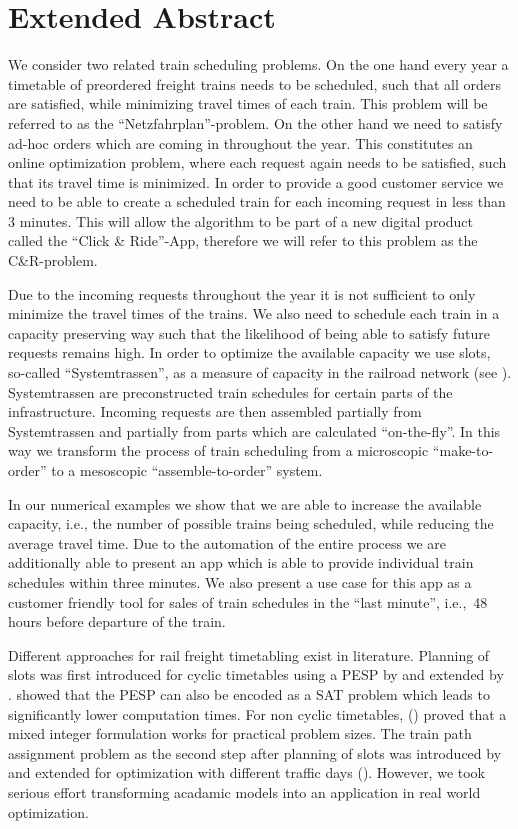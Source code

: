 \section{Extended Abstract}
\label{chap:extAbs}

We consider two related train scheduling problems. On the one hand every year a timetable of preordered freight trains needs to be scheduled, such that all orders are satisfied, while minimizing travel times of each train. This problem will be referred to as the ``Netzfahrplan''-problem. On the other hand we need to satisfy ad-hoc orders which are coming in throughout the year. This constitutes an online optimization problem, where each request again needs to be satisfied, such that its travel time is minimized. In order to provide a good customer service we need to be able to create a scheduled train for each incoming request in less than 3 minutes. This will allow the algorithm to be part of a new digital product called the ``Click \& Ride''-App, therefore we will refer to this problem as the C\&R-problem.

Due to the incoming requests throughout the year it is not sufficient to only minimize the travel times of the trains. We also need to schedule each train in a capacity preserving way such that the likelihood of being able to satisfy future requests remains high. In order to optimize the available capacity we use slots, so-called ``Systemtrassen'', as a measure of capacity in the railroad network (see \cite{FP:2014}). Systemtrassen are preconstructed train schedules for certain parts of the infrastructure. Incoming requests are then assembled partially from Systemtrassen and partially from parts which are calculated ``on-the-fly''.
In this way we transform the process of train scheduling from a microscopic ``make-to-order'' to a mesoscopic ``assemble-to-order'' system.

In our numerical examples we show that we are able to increase the available capacity, i.e., the number of possible trains being scheduled, while reducing the average travel time. Due to the automation of the entire process we are additionally able to present an app which is able to provide individual train schedules within three minutes. We also present a use case for this app as a customer friendly tool for sales of train schedules in the ``last minute'', i.e.,\ 48 hours before departure of the train.

Different approaches for rail freight timetabling exist in literature. Planning of slots was first introduced for cyclic timetables using a PESP by \cite{N:1998} and extended by \cite{O:2009}. \cite{G:2012} showed that the PESP can also be encoded as a SAT problem which leads to significantly lower computation times. For non cyclic timetables, (\cite{G:2013}) proved that a mixed integer formulation works for practical problem sizes.
The train path assignment problem as the second step after planning of slots was introduced by \cite{NO:2014} and extended for optimization with different traffic days (\cite{N:2015}). However, we took serious effort transforming acadamic models into an application in real world optimization.

